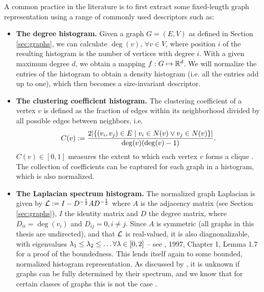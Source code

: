 A common practice in the literature is to first extract some fixed-length graph
representation using a range of commonly used descriptors such as:
\begin{itemize}
\item \textbf{The degree histogram.} Given a graph $G=(E,V)$ as defined in
Section \ref{sec:graphs}, we can calculate $\deg(v)$, $\forall v\in V$, where
position $i$ of the resulting histogram is the number of vertices with degree
$i$. With a given maximum degree $d$, we obtain a mapping $f:G\mapsto\mathbb{R}^d$. We
will normalize the entries of the histogram to obtain a density histogram (i.e.
all the entries add up to one), which then becomes a size-invariant descriptor.

\item \textbf{The clustering coefficient histogram.} The clustering coefficient
of a vertex $v$ is defined as the fraction of edges within its neighborhood
divided by all possible edges between neighbors, i.e.
  \begin{equation}
    C(v) := \frac{2\mleft|\mleft\{(v_i, v_j) \in E \mid  v_i \in N(v) \lor v_j \in N(v) \mright\}\mright|}{\deg(v) \mleft(\deg(v) - 1\mright)}.
  \end{equation}
  $C(v)\in\left[ 0,1 \right]$ measures the extent to which each vertex $v$ forms
  a clique \citep{watts1998collective}. The collection of coefficients can be
  captured for each graph in a histogram, which is also normalized.

\item \textbf{The Laplacian spectrum histogram.} The normalized graph Laplacian
is given by $\mathcal{L} :=I-D^{-{1\over 2}}AD^{-{1\over 2}}$ where $A$ is the
adjacency matrix (see Section \ref{sec:graphs}), $I$ the identity matrix and $D$
the degree matrix, where $D_{ii}=\deg(v_i)$ and $D_{ij}=0, i\neq j$. Since $A$
is symmetric (all graphs in this thesis are undirected), and that $\mathcal{L}$ is
real-valued, it is also diagnonalizable, with eigenvalues
$\lambda_1\leq\lambda_2\leq\ldots\forall\lambda\in \left[0,2\right]$ -- see
\cite{chung1997spectral}, 1997, Chapter 1, Lemma 1.7 for a proof of the
boundedness. This lends itself again to some bounded, normalized histogram
representation. As discussed by \cite{obray2022evaluation}, it is unknown if graphs
can be fully determined by their spectrum, and we know that for certain classes
of graphs this is not the case \citep{schwenk1973almost}.

\end{itemize}


